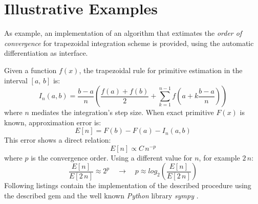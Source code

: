 \section{Illustrative Examples}
\label{sec:examples}


As example, an implementation of an algorithm that extimates the \emph{order of convergence} for trapezoidal integration scheme \cite{weideman2002numerical} is provided, using the automatic differentiation as interface.

Given a function $f(x)$, the trapezoidal rule for primitive estimation in the interval $[a,\,b]$ is:
\begin{equation}
  I_{n}(a, b) = \dfrac{b - a}{n} \left( \dfrac{f(a) + f(b)}{2} +
    \sum\limits_{k = 1}^{n - 1}{f \left( a + k \dfrac{b - a}{n} \right)} \right)
\end{equation}
where $n$ mediates the integration's step size. When exact primitive $F(x)$ is known, approximation error is:
\begin{equation}
  E[n] = F(b) - F(a) - I_{n}(a, b)
\end{equation}
This error shows a direct relation:
\begin{equation}
  E[n] \propto C\,{n}^{-p}
\end{equation}
where $p$ is the convergence order. Using a different value for $n$, for example $2\,n$:
\begin{equation}
  \dfrac{E[n]}{E[2\,n]} \approx 2^{p} \quad \rightarrow \quad p \approx log_2 \left( \dfrac{E[n]}{E[2\,n]} \right)
\end{equation}
Following listings contain the implementation of the described procedure using the described gem and the well known \emph{Python} \cite{van2011python} library \emph{sympy} \cite{christopher_smith_2016_47274}.

\noindent%
  \begin{minipage}{.5\textwidth}
    
  \end{minipage}\hfill
  \begin{minipage}{.5\textwidth}
    
  \end{minipage}
